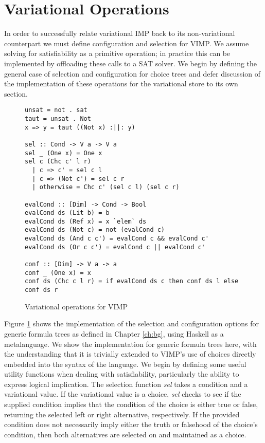 \documentclass[onehalf,11pt]{beavtex}
\begin{document}
\section{Variational Operations}

In order to successfully relate variational IMP back to its non-variational counterpart
we must define configuration and selection for VIMP. We assume solving for satisfiability
as a primitive operation; in practice this can be implemented by offloading these calls to
a SAT solver. We begin by defining the general case of selection and configuration for choice
trees and defer discussion of the implementation of these operations for the variational store to its own section.

\begin{figure}
\begin{lstlisting}
unsat = not . sat
taut = unsat . Not
x => y = taut ((Not x) :||: y)

sel :: Cond -> V a -> V a
sel _ (One x) = One x
sel c (Chc c' l r)
  | c => c' = sel c l
  | c => (Not c') = sel c r
  | otherwise = Chc c' (sel c l) (sel c r)
  
evalCond :: [Dim] -> Cond -> Bool
evalCond ds (Lit b) = b
evalCond ds (Ref x) = x `elem` ds
evalCond ds (Not c) = not (evalCond c)
evalCond ds (And c c') = evalCond c && evalCond c'
evalCond ds (Or c c') = evalCond c || evalCond c'

conf :: [Dim] -> V a -> a
conf _ (One x) = x
conf ds (Chc c l r) = if evalCond ds c then conf ds l else conf ds r
\end{lstlisting}
\caption{Variational operations for VIMP}
\label{fig:varops}
\end{figure}

Figure \ref{fig:varops} shows the implementation of the selection and configuration options for generic formula trees
as defined in Chapter \ref{ch:bg}, using Haskell as a metalanguage. We show the implementation for generic formula trees
here, with the understanding that it is trivially extended to VIMP's use of choices directly embedded into the syntax of the language.
We begin by defining some useful utility functions when dealing with satisfiability, particularly the ability to express logical implication.
The selection function \emph{sel} takes a condition and a variational value. If the variational value is a choice, \emph{sel} checks to see
if the supplied condition implies that the condition of the choice is either true or false, returning the selected left or right alternative, respectively.
If the provided condition does not necessarily imply either the truth or falsehood of the choice's condition, then both alternatives are selected on
and maintained as a choice.
\end{document}

